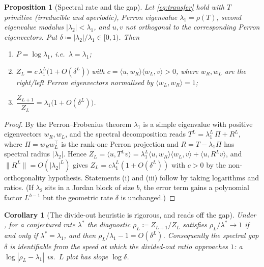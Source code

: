 \documentclass[11pt]{article}
\newcommand{\eqdef}{\coloneqq}
\newcommand{\pressure}{P}
\theoremstyle{plain}
\newtheorem{proposition}[theorem]{Proposition}
\newtheorem{corollary}[theorem]{Corollary}
\theoremstyle{definition}
\theoremstyle{remark}
\begin{document}
\begin{proposition}[Spectral rate and the gap]
\label{prop:spectral}
Let \eqref{eq:transfer} hold with $T$ primitive (irreducible and aperiodic),
Perron eigenvalue $\lambda_1=\rho(T)$, second eigenvalue modulus
$|\lambda_2|<\lambda_1$, and $u,v$ not orthogonal to the corresponding Perron
eigenvectors. Put $\delta\eqdef|\lambda_2|/\lambda_1\in[0,1)$. Then
\begin{enumerate}[label=\textup{(\roman*)},leftmargin=2.2em,itemsep=1pt]
\item $\pressure=\log\lambda_1$, i.e.\ $\lambda=\lambda_1$;
\item $Z_L=c\,\lambda_1^{L}\bigl(1+O(\delta^{L})\bigr)$ with
$c=\langle u,w_R\rangle\langle w_L,v\rangle>0$, where $w_R,w_L$ are the right/left
Perron eigenvectors normalised by $\langle w_L,w_R\rangle=1$;
\item $\dfrac{Z_{L+1}}{Z_L}=\lambda_1\bigl(1+O(\delta^{L})\bigr)$.
\end{enumerate}
\end{proposition}

\begin{proof}
By the Perron--Frobenius theorem $\lambda_1$ is a simple eigenvalue with positive
eigenvectors $w_R,w_L$, and the spectral decomposition reads
$T^{L}=\lambda_1^{L}\,\Pi+R^{L}$, where $\Pi=w_Rw_L^{\!\top}$ is the rank-one Perron
projection and $R=T-\lambda_1\Pi$ has spectral radius $|\lambda_2|$. Hence
$Z_L=\langle u,T^Lv\rangle=\lambda_1^{L}\langle u,w_R\rangle\langle w_L,v\rangle
+\langle u,R^{L}v\rangle$, and $\|R^L\|=O(|\lambda_2|^{L})$ gives
$Z_L=c\lambda_1^{L}(1+O(\delta^{L}))$ with $c>0$ by the non-orthogonality
hypothesis. Statements (i) and (iii) follow by taking logarithms and ratios.
(If $\lambda_2$ sits in a Jordan block of size $b$, the error term gains a
polynomial factor $L^{b-1}$ but the geometric rate $\delta$ is unchanged.)
\end{proof}

\begin{corollary}[The divide-out heuristic is rigorous, and reads off the gap]
\label{cor:divideout}
Under , for a conjectured rate $\lambda^\ast$ the diagnostic
$\rho_L\eqdef Z_{L+1}/Z_L$ satisfies $\rho_L/\lambda^\ast\to1$ if and only if
$\lambda^\ast=\lambda_1$, and then
$\rho_L/\lambda_1-1=O(\delta^{L})$. Consequently the spectral gap
$\delta$ is \emph{identifiable from the speed} at which the divided-out ratio
approaches $1$: a $\log|\rho_L-\lambda_1|$ vs.\ $L$ plot has slope $\log\delta$.
\end{corollary}
\end{document}
